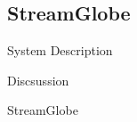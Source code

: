 \subsection*{StreamGlobe}
\label{sec:streamglobe}
\begin{structure}
	\item System Description
	\item Discsussion
\end{structure}


StreamGlobe \cite{streamglobe}
